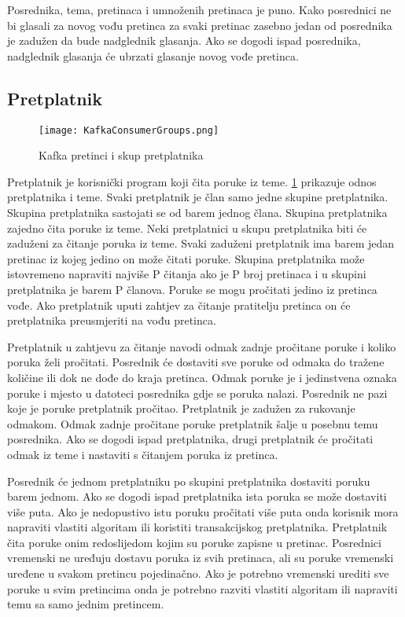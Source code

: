 \documentclass[times, utf8, diplomski, numeric]{fer}
\begin{document}
Posrednika, tema, pretinaca i umnoženih pretinaca je puno. Kako posrednici ne bi glasali za novog vođu pretinca za svaki pretinac zasebno jedan od posrednika je zadužen da bude nadglednik glasanja. Ako se dogodi ispad posrednika, nadglednik glasanja će ubrzati glasanje novog vođe pretinca.

\subsection{Pretplatnik}

\begin{figure}[H]
    \centering
    \texttt{[image: KafkaConsumerGroups.png]}
    \caption{Kafka pretinci i skup pretplatnika}
    \label{fig:kafka-consumer-group}
\end{figure}

Pretplatnik je korisnički program koji čita poruke iz teme. \ref{fig:kafka-consumer-group} prikazuje odnos pretplatnika i teme. Svaki pretplatnik je član samo jedne skupine pretplatnika. Skupina pretplatnika sastojati se od barem jednog člana. Skupina pretplatnika zajedno čita poruke iz teme. Neki pretplatnici u skupu pretplatnika biti će zaduženi za čitanje poruka iz teme. Svaki zaduženi pretplatnik ima barem jedan pretinac iz kojeg jedino on može čitati poruke. Skupina pretplatnika može istovremeno napraviti najviše P čitanja ako je P broj pretinaca i u skupini pretplatnika je barem P članova. Poruke se mogu pročitati jedino iz pretinca vođe. Ako pretplatnik uputi zahtjev za čitanje pratitelju pretinca on će pretplatnika preusmjeriti na vođu pretinca.

Pretplatnik u zahtjevu za čitanje navodi odmak zadnje pročitane poruke i koliko poruka želi pročitati. Posrednik će dostaviti sve poruke od odmaka do tražene količine ili dok ne dođe do kraja pretinca. Odmak poruke je i jedinstvena oznaka poruke i mjesto u datoteci posrednika gdje se poruka nalazi. Posrednik ne pazi koje je poruke pretplatnik pročitao. Pretplatnik je zadužen za rukovanje odmakom. Odmak zadnje pročitane poruke pretplatnik šalje u posebnu temu posrednika. Ako se dogodi ispad pretplatnika, drugi pretplatnik će pročitati odmak iz teme i nastaviti s čitanjem poruka iz pretinca.

Posrednik će jednom pretplatniku po skupini pretplatnika dostaviti poruku barem jednom. Ako se dogodi ispad pretplatnika ista poruka se može dostaviti više puta. Ako je nedopustivo istu poruku pročitati više puta onda korisnik mora napraviti vlastiti algoritam ili koristiti transakcijskog pretplatnika. Pretplatnik čita poruke onim redoslijedom kojim su poruke zapisne u pretinac. Posrednici vremenski ne uređuju dostavu poruka iz svih pretinaca, ali su poruke vremenski uređene u svakom pretincu pojedinačno. Ako je potrebno vremenski urediti sve poruke u svim pretincima onda je potrebno razviti vlastiti algoritam ili napraviti temu sa samo jednim pretincem.
\end{document}

